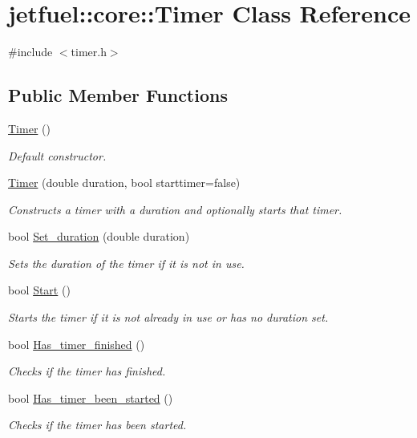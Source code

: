 \hypertarget{classjetfuel_1_1core_1_1Timer}{}\section{jetfuel\+:\+:core\+:\+:Timer Class Reference}
\label{classjetfuel_1_1core_1_1Timer}


{\ttfamily \#include $<$timer.\+h$>$}

\subsection*{Public Member Functions}
\begin{DoxyCompactItemize}
\item 
\hyperlink{classjetfuel_1_1core_1_1Timer_ac27fee7c9a0acbdbe7650b087ec26a7b}{Timer} ()
\begin{DoxyCompactList}\small\item\em Default constructor. \end{DoxyCompactList}\item 
\hyperlink{classjetfuel_1_1core_1_1Timer_ad856b1bc0f24893dafd8c608831adcf9}{Timer} (double duration, bool starttimer=false)
\begin{DoxyCompactList}\small\item\em Constructs a timer with a duration and optionally starts that timer. \end{DoxyCompactList}\item 
bool \hyperlink{classjetfuel_1_1core_1_1Timer_ae2ab6506258494eb67eed42b04931cde}{Set\+\_\+duration} (double duration)
\begin{DoxyCompactList}\small\item\em Sets the duration of the timer if it is not in use. \end{DoxyCompactList}\item 
bool \hyperlink{classjetfuel_1_1core_1_1Timer_a4f41614b70ab87a40ecd5ce55f2fc224}{Start} ()
\begin{DoxyCompactList}\small\item\em Starts the timer if it is not already in use or has no duration set. \end{DoxyCompactList}\item 
bool \hyperlink{classjetfuel_1_1core_1_1Timer_a8d6efef6a9e6aae8156fd1f8dce5f403}{Has\+\_\+timer\+\_\+finished} ()
\begin{DoxyCompactList}\small\item\em Checks if the timer has finished. \end{DoxyCompactList}\item 
bool \hyperlink{classjetfuel_1_1core_1_1Timer_a6442806833e30cc94d6c17dd91243c57}{Has\+\_\+timer\+\_\+been\+\_\+started} ()
\begin{DoxyCompactList}\small\item\em Checks if the timer has been started. \end{DoxyCompactList}\end{DoxyCompactItemize}


